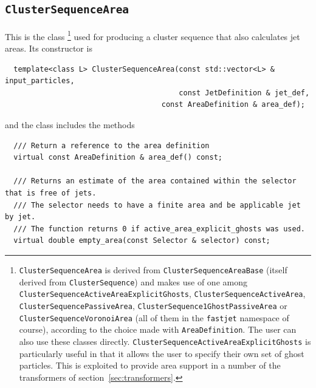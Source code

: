 \documentclass[12pt,a4]{article}
\begin{document}
\subsection{\tt ClusterSequenceArea}

This is the class%
%
\footnote{  
  \texttt{ClusterSequenceArea} is derived from
  \texttt{ClusterSequenceAreaBase} (itself derived from
  \texttt{ClusterSequence}) and makes use of one among
  \texttt{ClusterSequenceActiveAreaExplicitGhosts}, 
  \texttt{ClusterSequenceActiveArea}, 
  \texttt{ClusterSequencePassiveArea},
  \texttt{ClusterSequence1GhostPassiveArea} or 
  \texttt{ClusterSequenceVoronoiArea} (all of them in the \texttt{fastjet}
  namespace of course), according to the choice
  made with \texttt{AreaDefinition}. The user can also use these
  classes directly.
  \texttt{ClusterSequenceActiveAreaExplicitGhosts} is particularly
  useful in that it allows the user to specify their own set of ghost
  particles.
  This is exploited to provide area support in a number of the
  transformers of section~\ref{sec:transformers}.
}
%
used for producing a cluster sequence that also calculates jet areas.
Its constructor is
\begin{lstlisting}
  template<class L> ClusterSequenceArea(const std::vector<L> & input_particles, 
                                        const JetDefinition & jet_def,
	                                const AreaDefinition & area_def);
\end{lstlisting}
and the class includes the methods
\begin{lstlisting}
  /// Return a reference to the area definition
  virtual const AreaDefinition & area_def() const; 

  /// Returns an estimate of the area contained within the selector that is free of jets. 
  /// The selector needs to have a finite area and be applicable jet by jet.
  /// The function returns 0 if active_area_explicit_ghosts was used.
  virtual double empty_area(const Selector & selector) const;
\end{lstlisting}
\end{document}
